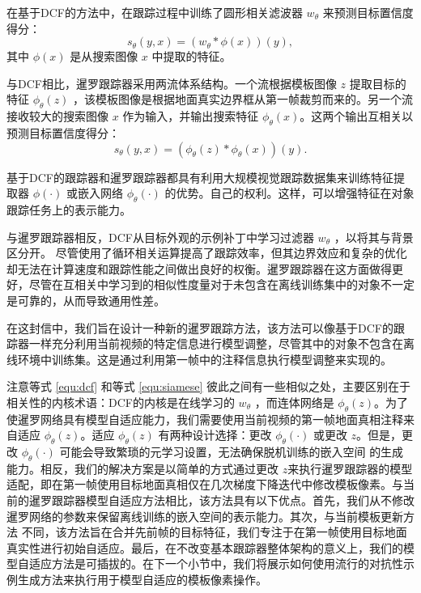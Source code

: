 在基于DCF的方法中，在跟踪过程中训练了圆形相关滤波器 $w_{\theta}$ 来预测目标置信度得分：
\begin{equation}
    s_\theta(y,x)=(w_\theta * \phi(x))(y),
    \label{equ:dcf}
\end{equation}
其中 $\phi(x)$ 是从搜索图像 $x$ 中提取的特征。

与DCF相比，暹罗跟踪器采用两流体系结构。一个流根据模板图像 $z$ 提取目标的特征 $\phi_\theta(z)$ ，该模板图像是根据地面真实边界框从第一帧裁剪而来的。另一个流接收较大的搜索图像 $x$ 作为输入，并输出搜索特征 $\phi_\theta(x)$。这两个输出互相关以预测目标置信度得分：
\begin{equation}
    s_\theta(y,x)=(\phi_\theta(z) * \phi_\theta(x))(y).
    \label{equ:siamese}
\end{equation}

基于DCF的跟踪器和暹罗跟踪器都具有利用大规模视觉跟踪数据集来训练特征提取器 $\phi(\cdot)$ 或嵌入网络 $\phi_{\theta}(\cdot)$ 的优势。自己的权利。这样，可以增强特征在对象跟踪任务上的表示能力。

与暹罗跟踪器相反，DCF从目标外观的示例补丁中学习过滤器 $w_\theta$ ，以将其与背景区分开。
尽管使用了循环相关运算提高了跟踪效率，但其边界效应和复杂的优化却无法在计算速度和跟踪性能之间做出良好的权衡。暹罗跟踪器在这方面做得更好，尽管在互相关中学习到的相似性度量对于未包含在离线训练集中的对象不一定是可靠的，从而导致通用性差。

在这封信中，我们旨在设计一种新的暹罗跟踪方法，该方法可以像基于DCF的跟踪器一样充分利用当前视频的特定信息进行模型调整，尽管其中的对象不包含在离线环境中训练集。这是通过利用第一帧中的注释信息执行模型调整来实现的。

注意等式 \ref{equ:dcf} 和等式 \ref{equ:siamese} 彼此之间有一些相似之处，主要区别在于相关性的内核术语：DCF的内核是在线学习的 $w_{\theta}$ ，而连体网络是 $\phi_\theta(z)$。为了使暹罗网络具有模型自适应能力，我们需要使用当前视频的第一帧地面真相注释来自适应 $\phi_\theta(z)$。适应 $\phi_\theta(z)$ 有两种设计选择：更改 $\phi_\theta(\cdot)$ 或更改 $z$。但是，更改 $\phi_\theta(\cdot)$ 可能会导致繁琐的元学习设置，无法确保脱机训练的嵌入空间 \cite{ROAM, DBLP:conf/aaai/JungYNCH20}的生成能力。相反，我们的解决方案是以简单的方式通过更改 $z$来执行暹罗跟踪器的模型适配，即在第一帧使用目标地面真相仅在几次梯度下降迭代中修改模板像素。与当前的暹罗跟踪器模型自适应方法相比，该方法具有以下优点。首先，我们从不修改暹罗网络的参数来保留离线训练的嵌入空间的表示能力。其次，与当前模板更新方法 \cite{zhu2018distractor, Zhang_2019_ICCV} 不同，该方法旨在合并先前帧的目标特征，我们专注于在第一帧使用目标地面真实性进行初始自适应。最后，在不改变基本跟踪器整体架构的意义上，我们的模型自适应方法是可插拔的。在下一个小节中，我们将展示如何使用流行的对抗性示例生成方法来执行用于模型自适应的模板像素操作。

